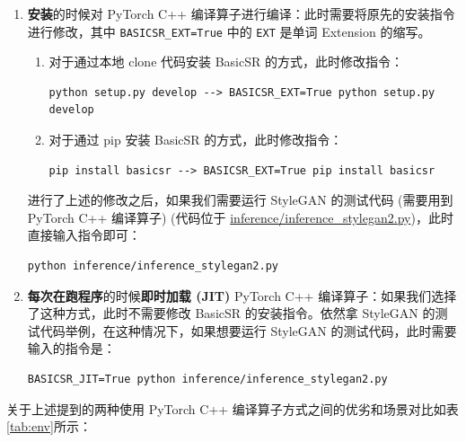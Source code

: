 \documentclass[../main.tex]{subfiles}
\begin{document}
\begin{enumerate}
    \item \textbf{安装}的时候对 PyTorch C++ 编译算子进行编译：此时需要将原先的安装指令进行修改，其中 \texttt{BASICSR\_EXT=True} 中的 \texttt{EXT} 是单词 Extension 的缩写。
          \begin{enumerate}
              \item 对于通过本地 clone 代码安装 BasicSR 的方式，此时修改指令：
                    \begin{verbatim}
python setup.py develop --> BASICSR_EXT=True python setup.py develop
        \end{verbatim}
              \item 对于通过 pip 安装 BasicSR 的方式，此时修改指令：
                    \begin{verbatim}
pip install basicsr --> BASICSR_EXT=True pip install basicsr
        \end{verbatim}
          \end{enumerate}
          进行了上述的修改之后，如果我们需要运行 StyleGAN 的测试代码 (需要用到 PyTorch C++ 编译算子) (代码位于 \href{https://github.com/XPixelGroup/BasicSR/blob/master/inference/inference_stylegan2.py}{inference/inference\_stylegan2.py})，此时直接输入指令即可：
          \begin{verbatim}
python inference/inference_stylegan2.py
        \end{verbatim}

    \item \textbf{每次在跑程序}的时候\textbf{即时加载 (JIT)} PyTorch C++ 编译算子：如果我们选择了这种方式，此时不需要修改 BasicSR 的安装指令。依然拿 StyleGAN 的测试代码举例，在这种情况下，如果想要运行 StyleGAN 的测试代码，此时需要输入的指令是：
          \begin{verbatim}
BASICSR_JIT=True python inference/inference_stylegan2.py
    \end{verbatim}

\end{enumerate}

关于上述提到的两种使用 PyTorch C++ 编译算子方式之间的优劣和场景对比如表\ref{tab:env}所示：
\end{document}
